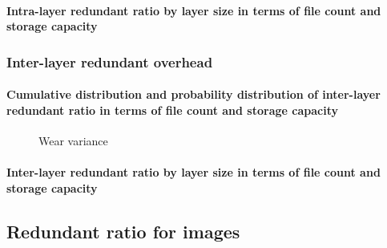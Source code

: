 \paragraph{Intra-layer redundant ratio by layer size in terms of file count and storage capacity}

\subsubsection{Inter-layer redundant overhead}

\paragraph{Cumulative distribution and probability distribution of inter-layer redundant ratio in terms of file count and storage capacity}

\begin{figure}
	\centering
	\caption{Wear variance}
	\label{fig:eval-stdev-erasure-cnt}
\end{figure}

\paragraph{Inter-layer redundant ratio by layer size in terms of file count and storage capacity}

\subsection{Redundant ratio for images}

